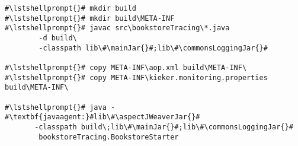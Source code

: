 \begin{lstlisting}[caption=Commands to compile and run the annotated Bookstore under Windows, label=lst:traceAnalysisCompileRunExample1Win]
#\lstshellprompt{}# mkdir build
#\lstshellprompt{}# mkdir build\META-INF
#\lstshellprompt{}# javac src\bookstoreTracing\*.java
        -d build\
        -classpath lib\#\mainJar{}#;lib\#\commonsLoggingJar{}#

#\lstshellprompt{}# copy META-INF\aop.xml build\META-INF\
#\lstshellprompt{}# copy META-INF\kieker.monitoring.properties build\META-INF\

#\lstshellprompt{}# java -#\textbf{javaagent:}#lib\#\aspectJWeaverJar{}# 
       -classpath build\;lib\#\mainJar{}#;lib\#\commonsLoggingJar{}# 
        bookstoreTracing.BookstoreStarter
\end{lstlisting}
